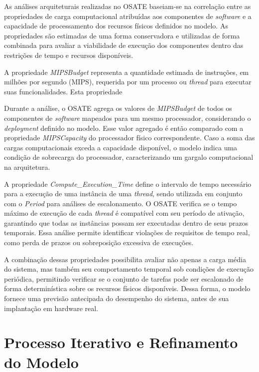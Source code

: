 As análises arquiteturais realizadas no OSATE baseiam-se na correlação entre as propriedades de carga computacional atribuídas aos componentes de \textit{software} e a capacidade de processamento dos recursos físicos definidos no modelo. As propriedades são estimadas de uma forma conservadora e utilizadas de forma combinada para avaliar a viabilidade de execução dos componentes dentro das restrições de tempo e recursos disponíveis.

A propriedade \textit{MIPSBudget} representa a quantidade estimada de instruções, em milhões por segundo (MIPS), requerida por um processo ou \textit{thread} para executar suas funcionalidades. Esta propriedade 

Durante a análise, o OSATE agrega os valores de \textit{MIPSBudget} de todos os componentes de \textit{software} mapeados para um mesmo processador, considerando o \textit{deployment} definido no modelo. Esse valor agregado é então comparado com a propriedade \textit{MIPSCapacity} do processador físico correspondente. Caso a soma das cargas computacionais exceda a capacidade disponível, o modelo indica uma condição de sobrecarga do processador, caracterizando um gargalo computacional na arquitetura.

A propriedade \textit{Compute\_Execution\_Time} define o intervalo de tempo necessário para a execução de uma instância de uma \textit{thread}, sendo utilizada em conjunto com o \textit{Period} para análises de escalonamento. O OSATE verifica se o tempo máximo de execução de cada \textit{thread} é compatível com seu período de ativação, garantindo que todas as instâncias possam ser executadas dentro de seus prazos temporais. Essa análise permite identificar violações de requisitos de tempo real, como perda de prazos ou sobreposição excessiva de execuções.

A combinação dessas propriedades possibilita avaliar não apenas a carga média do sistema, mas também seu comportamento temporal sob condições de execução periódica, permitindo verificar se o conjunto de tarefas pode ser escalonado de forma determinística sobre os recursos físicos disponíveis. Dessa forma, o modelo fornece uma previsão antecipada do desempenho do sistema, antes de sua implantação em hardware real.



\section{Processo Iterativo e Refinamento do Modelo}

